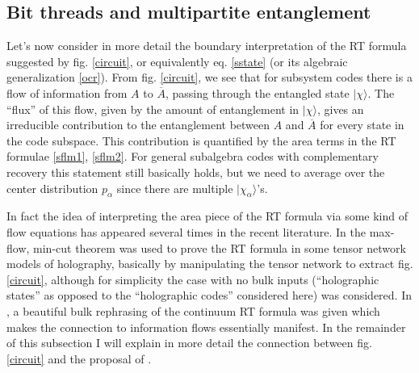 \documentclass[12pt]{article}
\newcommand{\ran}{\rangle}
\newcommand{\Ab}{\ol{A}}
\newcommand{\ol}{\overline}
\begin{document}
\subsection{Bit threads and multipartite entanglement}
Let's now consider in more detail the boundary interpretation of the RT formula suggested by fig. \ref{circuit}, or equivalently eq. \eqref{sstate} (or its algebraic generalization \eqref{ocr}).  From fig. \ref{circuit}, we see that for subsystem codes there is a flow of information from $A$ to $\Ab$, passing through the entangled state $|\chi\ran$.  The ``flux'' of this flow, given by the amount of entanglement in $|\chi\ran$, gives an irreducible contribution to the entanglement between $A$ and $\Ab$ for every state in the code subspace.  This contribution is quantified by the area terms in the RT formulae \eqref{sflm1}, \eqref{sflm2}.  For general subalgebra codes with complementary recovery this statement still basically holds, but we need to average over the center distribution $p_\alpha$ since there are multiple $|\chi_\alpha\ran$'s.

In fact the idea of interpreting the area piece of the RT formula via some kind of flow equations has appeared several times in the recent literature.  In \cite{Pastawski:2015qua} the max-flow, min-cut theorem was used to prove the RT formula in some tensor network models of holography, basically by manipulating the tensor network to extract fig. \ref{circuit}, although for simplicity the case with no bulk inputs (``holographic states'' as opposed to the ``holographic codes'' considered here) was considered.  In \cite{Freedman:2016zud}, a beautiful bulk rephrasing of the continuum RT formula was given which makes the connection to information flows essentially manifest.  In the remainder of this subsection I will explain in more detail the connection between fig. \ref{circuit} and the proposal of \cite{Freedman:2016zud}.
\end{document}
